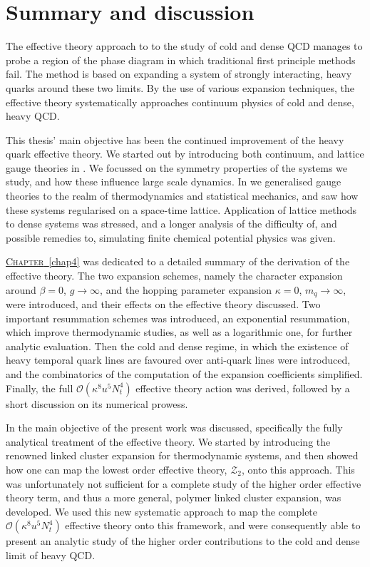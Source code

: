 \chapter{Summary and discussion}

The effective theory approach to to the study of cold and dense QCD
manages to probe a region of the phase diagram in which traditional first
principle methods fail. The method is based on expanding a system of strongly
interacting, heavy quarks around these two limits. By the use of various
expansion techniques, the effective theory systematically approaches continuum
physics of cold and dense, heavy QCD.

This thesis' main objective has been the continued improvement of the heavy
quark effective theory. We started out by introducing both continuum, and
lattice gauge theories in . We focussed on the symmetry
properties of the systems we study, and how these influence large scale
dynamics. In  we generalised gauge theories to the realm of
thermodynamics and statistical mechanics, and saw how these systems regularised
on a space-time lattice.  Application of lattice methods to dense systems was
stressed, and a longer analysis of the difficulty of, and possible remedies to,
simulating finite chemical potential physics was given.

\hyperref[chap4]{\mbox{\textsc{Chapter} \ref*{chap4}}} was dedicated to a
detailed summary of the derivation of the effective theory. The two expansion
schemes, namely the character expansion around $\beta = 0$, $g \to \infty$, and
the hopping parameter expansion $\kappa = 0$, $m_q \to \infty$, were introduced,
and their effects on the effective theory discussed. Two important resummation
schemes was introduced, an exponential resummation, which improve thermodynamic
studies, as well as a logarithmic one, for further analytic evaluation. Then the
cold and dense regime, in which the existence of heavy temporal quark lines are
favoured over anti-quark lines were introduced, and the combinatorics of the
computation of the expansion coefficients simplified. Finally, the full
$\mathcal{O}(\kappa^8 u^5 N_t^4)$ effective theory action was derived, followed
by a short discussion on its numerical prowess.

In  the main objective of the present work was discussed,
specifically the fully analytical treatment of the effective theory. We started
by introducing the renowned linked cluster expansion for thermodynamic systems,
and then showed how one can map the lowest order effective theory,
$\mathcal{Z}_2$, onto this approach. This was unfortunately not sufficient for a
complete study of the higher order effective theory term, and thus a more
general, polymer linked cluster expansion, was developed. We used this new
systematic approach to map the complete $\mathcal{O}(\kappa^8 u^5 N_t^4)$
effective theory onto this framework, and were consequently able to present an
analytic study of the higher order contributions to the cold and dense limit of
heavy QCD.

